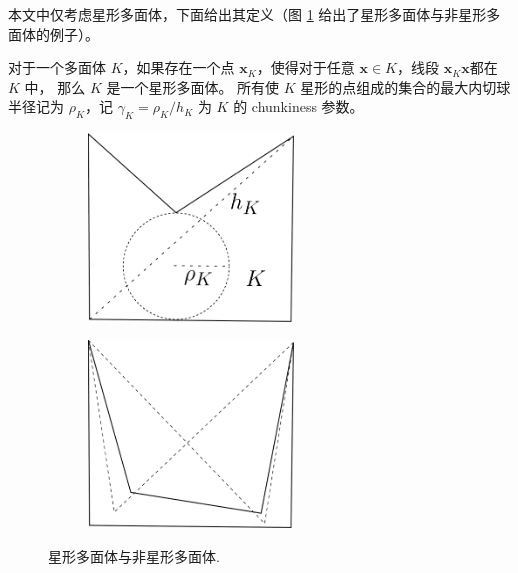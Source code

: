 本文中仅考虑星形多面体，下面给出其定义（图 \ref{fig:star}
给出了星形多面体与非星形多面体的例子）。
\begin{definition}[星形多面体]
    对于一个多面体 $K$，如果存在一个点 $\boldsymbol{x}_K$，使得对于任意
    $\boldsymbol{x}\in K$，线段 $\boldsymbol{x}_K\boldsymbol{x}$都在 $K$ 中，
    那么 $K$ 是一个星形多面体。
    所有使 $K$ 星形的点组成的集合的最大内切球半径记为 $\rho_K$，记 $\gamma_K =
    \rho_K/h_K$ 为 $K$ 的 chunkiness 参数。
\end{definition}
\begin{figure}[htbp]
    \centering
\begin{subfigure}[b]{0.4\textwidth}
    \centering
    \includegraphics[width=0.6\textwidth]{./figures/star-shaped.pdf}
\end{subfigure}
\begin{subfigure}[b]{0.4\textwidth}
    \centering
    \includegraphics[width=0.6\textwidth]{./figures/no-star-shaped.pdf}
\end{subfigure}
\caption{星形多面体与非星形多面体.}
    \label{fig:star}
\end{figure}



